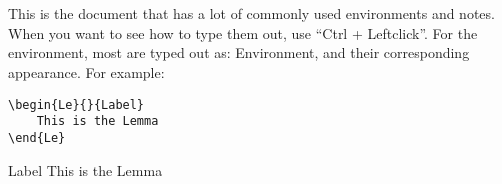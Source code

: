 
\section*{\IntroductionName}
This is the document that has a lot of commonly used environments and notes. When you want to see how to type
them out, use ``Ctrl + Leftclick''. For the environment, most are typed out as: Environment, and their corresponding appearance. For example: \newpage
\begin{verbatim}
\begin{Le}{}{Label}
    This is the Lemma
\end{Le}
\end{verbatim}
\begin{Le}{}{Label}
    This is the Lemma
\end{Le}